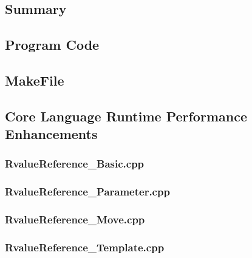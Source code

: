 \documentclass[11pt]{report}
\newcommand{\Cpp}{\lstset{language=C++,keywordstyle=\bfseries,breaklines,breakindent=30pt}}
\newcommand{\Make}{\lstset{language=make}}
\begin{document}
\section{Summary}
\label{section1: Summary}


	


\begin{appendix}

\chapter{Program Code}
\label{chapter:Programcode}


\section{MakeFile}
\label{Makefile}

\Make


\newpage


\section{Core Language Runtime Performance Enhancements}
\label{Appendix: corelanguage runtime performance}

\Cpp

\subsection{RvalueReference\_Basic.cpp}
\label{RvalueReference_Basic}


\subsection{RvalueReference\_Parameter.cpp}
\label{RvalueReference_Parameter}


\subsection{RvalueReference\_Move.cpp}
\label{RvalueReference_Move}


\subsection{RvalueReference\_Template.cpp}
\label{RvalueReference_Template}



\end{appendix}
\end{document}
